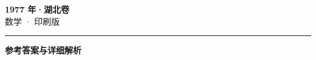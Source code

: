 \documentclass[zihao=5, a4paper]{ctexart}
\begin{document}
\begin{center}
  {\Large\bfseries 1977 年·湖北卷}\\[4pt]
  {\large 数学 · 印刷版}
\end{center}
\medskip
{}

\par\bigskip\hrule\bigskip
{}
\begin{center}{\large\bfseries 参考答案与详细解析}\end{center}
\smallskip

\end{document}
